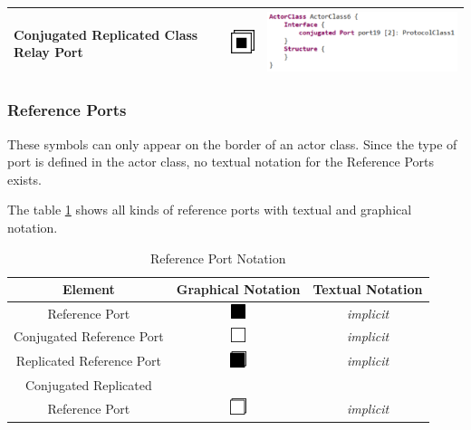 \begin{table}
\begin{longtable}{|b{2.5cm}|c|b{5.5cm}|}
 \raggedright Conjugated Replicated Class Relay Port & 
\includegraphics[scale=0.7]{images/040-ConjugatedReplicatedClassRelayPort.png} & 
\includegraphics[scale=0.7]{images/040-ConjugatedReplicatedClassRelayPortTextual.png} \\ \hline
\end{longtable}
\end{table}

\subsubsection{Reference Ports}

These symbols can only appear on the border of an actor class. Since the type of port is defined 
in the actor class, no textual notation for the Reference Ports exists.

The table \ref{tab:reference_port_notation} shows all kinds of reference ports with textual and graphical notation.

\begin{table}
\caption{Reference Port Notation}
\label{tab:reference_port_notation}
\begin{tabular}{|c|c|c|}
\hline
 \textbf{Element} & \textbf{Graphical Notation} & \textbf{Textual Notation} \\ \hline
 Reference Port & \includegraphics{images/040-ReferencePort.png} & \textit{implicit} \\ \hline
 Conjugated Reference Port & \includegraphics{images/040-ConjugatedReferencePort.png} & \textit{implicit} 
\\ \hline
 Replicated Reference Port & \includegraphics{images/040-ReplicatedReferencePort.png} & \textit{implicit} 
\\ \hline
 Conjugated Replicated \\ Reference Port & 
\includegraphics{images/040-ConjugatedReplicatedReferencePort.png} & \textit{implicit} \\ \hline
\end{tabular}
\end{table}

